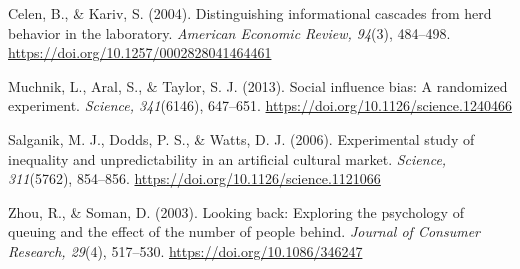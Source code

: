 \documentclass[stu,12pt,floatsintext]{apa7}
\begin{document}
\noindent Celen, B., \& Kariv, S. (2004). Distinguishing informational cascades from herd behavior in the laboratory. \textit{American Economic Review, 94}(3), 484--498. \url{https://doi.org/10.1257/0002828041464461}

\noindent Muchnik, L., Aral, S., \& Taylor, S. J. (2013). Social influence bias: A randomized experiment. \textit{Science, 341}(6146), 647--651. \url{https://doi.org/10.1126/science.1240466}

\noindent Salganik, M. J., Dodds, P. S., \& Watts, D. J. (2006). Experimental study of inequality and unpredictability in an artificial cultural market. \textit{Science, 311}(5762), 854--856. \url{https://doi.org/10.1126/science.1121066}

\noindent Zhou, R., \& Soman, D. (2003). Looking back: Exploring the psychology of queuing and the effect of the number of people behind. \textit{Journal of Consumer Research, 29}(4), 517--530. \url{https://doi.org/10.1086/346247}

\endgroup
\end{document}
